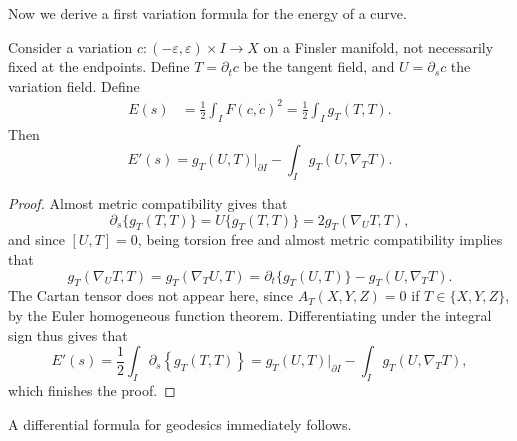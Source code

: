 Now we derive a first variation formula for the energy of a curve.

\begin{prop}
  Consider a variation $c: (-\varepsilon,\varepsilon) \times I \to X$ on a Finsler manifold, not necessarily fixed at the endpoints. Define $T = \partial_t c$ be the tangent field, and $U = \partial_s c$ the variation field. Define
  \begin{align*}
    E(s) &= \frac{1}{2} \int_I F(c,\dot{c})^2 = \frac{1}{2} \int_I g_T( T, T ).
  \end{align*}
  Then
  \[ E'(s) = g_T(U,T)|_{\partial I} - \int_I g_T(U,\nabla_T T). \]
\end{prop}
\begin{proof}
Almost metric compatibility gives that
%
\begin{equation}
  \partial_s \{ g_T(T,T) \} = U \{ g_T(T,T) \} = 2 g_T(\nabla_U T, T),
\end{equation}
%
and since $[U,T] = 0$, being torsion free and almost metric compatibility implies that
%
\begin{equation}
  g_T( \nabla_U T, T ) = g_T( \nabla_T U, T ) = \partial_t \{ g_T(U,T) \} - g_T(U, \nabla_T T).
\end{equation}
%
The Cartan tensor does not appear here, since $A_T(X,Y,Z) = 0$ if $T \in \{X,Y,Z\}$, by the Euler homogeneous function theorem. Differentiating under the integral sign thus gives that
%
\begin{equation}
  E'(s) = \frac{1}{2} \int_I \partial_s \left\{ g_T(T,T) \right\} = g_T(U,T)|_{\partial I} - \int_I g_T(U, \nabla_T T),
\end{equation}
%
which finishes the proof.
\end{proof}

A differential formula for geodesics immediately follows.

